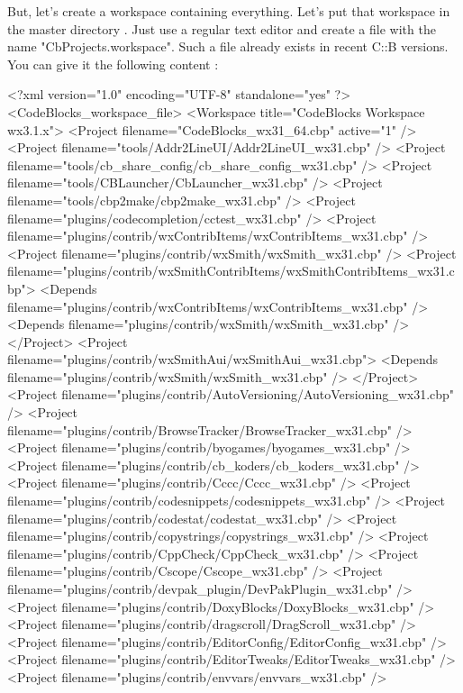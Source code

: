 But, let's create a workspace containing everything. Let's put that workspace in the master directory . Just use a regular text editor and create a file with the name "CbProjects.workspace". Such a file already exists in recent C::B versions. You can give it the following content : 

\begin{code}
<?xml version="1.0" encoding="UTF-8" standalone="yes" ?>
<CodeBlocks_workspace_file>
  <Workspace title="CodeBlocks Workspace wx3.1.x">
    <Project filename="CodeBlocks_wx31_64.cbp" active="1" />
    <Project filename="tools/Addr2LineUI/Addr2LineUI_wx31.cbp" />
    <Project filename="tools/cb_share_config/cb_share_config_wx31.cbp" />
    <Project filename="tools/CBLauncher/CbLauncher_wx31.cbp" />
    <Project filename="tools/cbp2make/cbp2make_wx31.cbp" />
    <Project filename="plugins/codecompletion/cctest_wx31.cbp" />
    <Project filename="plugins/contrib/wxContribItems/wxContribItems_wx31.cbp" />
    <Project filename="plugins/contrib/wxSmith/wxSmith_wx31.cbp" />
    <Project filename="plugins/contrib/wxSmithContribItems/wxSmithContribItems_wx31.cbp">
      <Depends filename="plugins/contrib/wxContribItems/wxContribItems_wx31.cbp" />
      <Depends filename="plugins/contrib/wxSmith/wxSmith_wx31.cbp" />
    </Project>
    <Project filename="plugins/contrib/wxSmithAui/wxSmithAui_wx31.cbp">
      <Depends filename="plugins/contrib/wxSmith/wxSmith_wx31.cbp" />
    </Project>
    <Project filename="plugins/contrib/AutoVersioning/AutoVersioning_wx31.cbp" />
    <Project filename="plugins/contrib/BrowseTracker/BrowseTracker_wx31.cbp" />
    <Project filename="plugins/contrib/byogames/byogames_wx31.cbp" />
    <Project filename="plugins/contrib/cb_koders/cb_koders_wx31.cbp" />
    <Project filename="plugins/contrib/Cccc/Cccc_wx31.cbp" />
    <Project filename="plugins/contrib/codesnippets/codesnippets_wx31.cbp" />
    <Project filename="plugins/contrib/codestat/codestat_wx31.cbp" />
    <Project filename="plugins/contrib/copystrings/copystrings_wx31.cbp" />
    <Project filename="plugins/contrib/CppCheck/CppCheck_wx31.cbp" />
    <Project filename="plugins/contrib/Cscope/Cscope_wx31.cbp" />
    <Project filename="plugins/contrib/devpak_plugin/DevPakPlugin_wx31.cbp" />
    <Project filename="plugins/contrib/DoxyBlocks/DoxyBlocks_wx31.cbp" />
    <Project filename="plugins/contrib/dragscroll/DragScroll_wx31.cbp" />
    <Project filename="plugins/contrib/EditorConfig/EditorConfig_wx31.cbp" />
    <Project filename="plugins/contrib/EditorTweaks/EditorTweaks_wx31.cbp" />
    <Project filename="plugins/contrib/envvars/envvars_wx31.cbp" />

\end{code}
